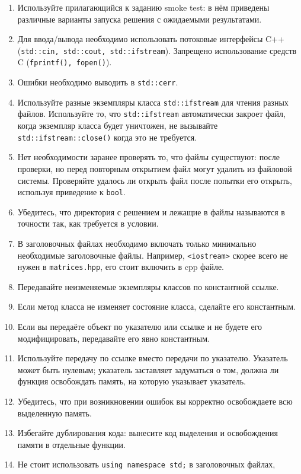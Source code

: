 \documentclass[a4paper,10pt]{article}
\begin{document}
\begin{enumerate}
    \item Используйте прилагающийся к заданию smoke test:
    в нём приведены различные варианты запуска решения с ожидаемыми результатами.
    \item Для ввода/вывода необходимо использовать потоковые интерфейсы C++ ({\tt std::cin, std::cout, std::ifstream}).
    Запрещено использование средств C ({\tt fprintf(), fopen()}).
    \item Ошибки необходимо выводить в {\tt std::cerr}.
    \item Используйте разные экземпляры класса {\tt std::ifstream} для чтения разных файлов.
    Используйте то, что {\tt std::ifstream} автоматически закроет файл,
    когда экземпляр класса будет уничтожен, не вызывайте {\tt std::ifstream::close()} когда это не требуется.
    \item Нет необходимости заранее проверять то, что файлы существуют:
    после проверки, но перед повторным открытием файл могут удалить из файловой системы.
    Проверяйте удалось ли открыть файл после попытки его открыть, используя приведение к {\tt bool}.
    \item Убедитесь, что директория с решением и лежащие в файлы называются в точности так, как требуется в условии.
    \item В заголовочных файлах необходимо включать только минимально необходимые заголовочные файлы.
    Например, {\tt <iostream>} скорее всего не нужен в {\tt matrices.hpp}, его стоит включить в cpp файле.
    \item Передавайте неизменяемые экземпляры классов по константной ссылке.
    \item Если метод класса не изменяет состояние класса, сделайте его константным.
    \item Если вы передаёте объект по указателю или ссылке и не будете его модифицировать,
    передавайте его явно константным.
    \item Используйте передачу по ссылке вместо передачи по указателю.
    Указатель может быть нулевым; указатель заставляет задуматься о том,
    должна ли функция освобождать память, на которую указывает указатель.
    \item Убедитесь, что при возникновении ошибок вы корректно освобождаете всю выделенную память.
    \item Избегайте дублирования кода: вынесите код выделения и освобождения памяти в отдельные функции.
    \item Не стоит использовать {\tt using namespace std;} в заголовочных файлах,

\end{enumerate}
\end{document}
